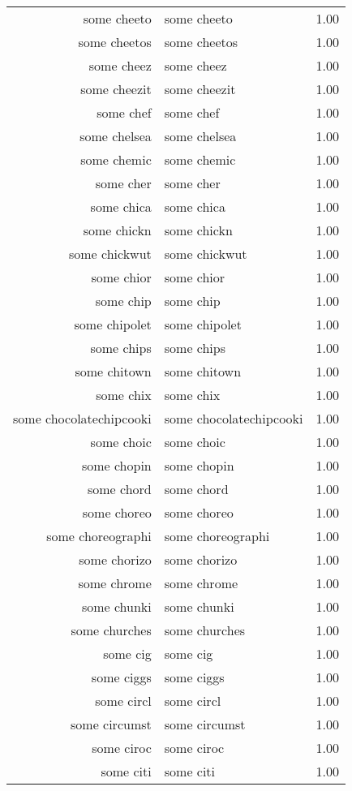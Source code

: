 \begin{table}[ht]
\begin{tabular}{rlr}
  some cheeto & some cheeto & 1.00 \\ 
  some cheetos & some cheetos & 1.00 \\ 
  some cheez & some cheez & 1.00 \\ 
  some cheezit & some cheezit & 1.00 \\ 
  some chef & some chef & 1.00 \\ 
  some chelsea & some chelsea & 1.00 \\ 
  some chemic & some chemic & 1.00 \\ 
  some cher & some cher & 1.00 \\ 
  some chica & some chica & 1.00 \\ 
  some chickn & some chickn & 1.00 \\ 
  some chickwut & some chickwut & 1.00 \\ 
  some chior & some chior & 1.00 \\ 
  some chip & some chip & 1.00 \\ 
  some chipolet & some chipolet & 1.00 \\ 
  some chips & some chips & 1.00 \\ 
  some chitown & some chitown & 1.00 \\ 
  some chix & some chix & 1.00 \\ 
  some chocolatechipcooki & some chocolatechipcooki & 1.00 \\ 
  some choic & some choic & 1.00 \\ 
  some chopin & some chopin & 1.00 \\ 
  some chord & some chord & 1.00 \\ 
  some choreo & some choreo & 1.00 \\ 
  some choreographi & some choreographi & 1.00 \\ 
  some chorizo & some chorizo & 1.00 \\ 
  some chrome & some chrome & 1.00 \\ 
  some chunki & some chunki & 1.00 \\ 
  some churches & some churches & 1.00 \\ 
  some cig & some cig & 1.00 \\ 
  some ciggs & some ciggs & 1.00 \\ 
  some circl & some circl & 1.00 \\ 
  some circumst & some circumst & 1.00 \\ 
  some ciroc & some ciroc & 1.00 \\ 
  some citi & some citi & 1.00 \\ 

\end{tabular}
\end{table}
